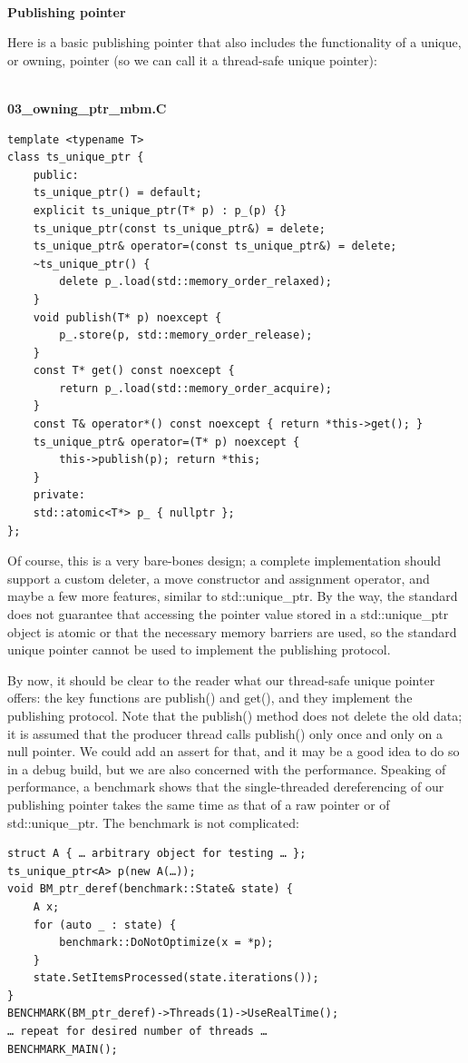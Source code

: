 \hspace*{\fill} \\ %
\noindent
\textbf{Publishing pointer}

Here is a basic publishing pointer that also includes the functionality of a unique, or owning, pointer (so we can call it a thread-safe unique pointer):

\hspace*{\fill} \\ %
\noindent
\textbf{03\_owning\_ptr\_mbm.C}
\begin{lstlisting}[style=styleCXX]
template <typename T>
class ts_unique_ptr {
	public:
	ts_unique_ptr() = default;
	explicit ts_unique_ptr(T* p) : p_(p) {}
	ts_unique_ptr(const ts_unique_ptr&) = delete;
	ts_unique_ptr& operator=(const ts_unique_ptr&) = delete;
	~ts_unique_ptr() {
		delete p_.load(std::memory_order_relaxed);
	}
	void publish(T* p) noexcept {
		p_.store(p, std::memory_order_release);
	}
	const T* get() const noexcept {
		return p_.load(std::memory_order_acquire);
	}
	const T& operator*() const noexcept { return *this->get(); }
	ts_unique_ptr& operator=(T* p) noexcept {
		this->publish(p); return *this;
	}
	private:
	std::atomic<T*> p_ { nullptr };
};
\end{lstlisting}

Of course, this is a very bare-bones design; a complete implementation should support a custom deleter, a move constructor and assignment operator, and maybe a few more features, similar to std::unique\_ptr. By the way, the standard does not guarantee that accessing the pointer value stored in a std::unique\_ptr object is atomic or that the necessary memory barriers are used, so the standard unique pointer cannot be used to implement the publishing protocol.

By now, it should be clear to the reader what our thread-safe unique pointer offers: the key functions are publish() and get(), and they implement the publishing protocol. Note that the publish() method does not delete the old data; it is assumed that the producer thread calls publish() only once and only on a null pointer. We could add an assert for that, and it may be a good idea to do so in a debug build, but we are also concerned with the performance. Speaking of performance, a benchmark shows that the single-threaded dereferencing of our publishing pointer takes the same time as that of a raw pointer or of std::unique\_ptr. The benchmark is not complicated:

\begin{lstlisting}[style=styleCXX]
struct A { … arbitrary object for testing … };
ts_unique_ptr<A> p(new A(…));
void BM_ptr_deref(benchmark::State& state) {
	A x;
	for (auto _ : state) {
		benchmark::DoNotOptimize(x = *p);
	}
	state.SetItemsProcessed(state.iterations());
}
BENCHMARK(BM_ptr_deref)->Threads(1)->UseRealTime();
… repeat for desired number of threads …
BENCHMARK_MAIN();
\end{lstlisting}


